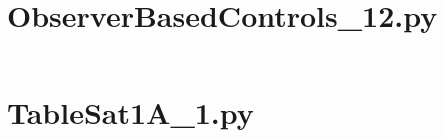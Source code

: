 \pagebreak
\section*{ObserverBasedControls\_12.py}\label{code:TSatPySamples/ObserverBasedControls_12.py}\inputminted[linenos,fontsize=\scriptsize]{python}{/home/dcouture/git/mathyourlife/TSatPy/tex/sample_scripts/ObserverBasedControls_12.py}

\pagebreak
\section*{TableSat1A\_1.py}\label{code:TSatPySamples/TableSat1A_1.py}\inputminted[linenos,fontsize=\scriptsize]{python}{/home/dcouture/git/mathyourlife/TSatPy/tex/sample_scripts/TableSat1A_1.py}
